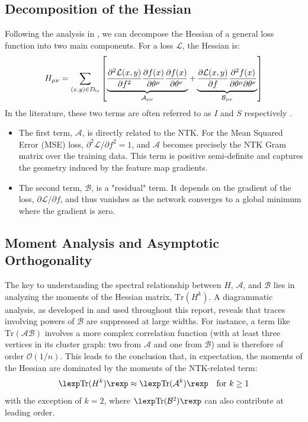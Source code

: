 \documentclass{article}
\begin{document}
\subsection{Decomposition of the Hessian}
Following the analysis in \cite{dyer2019asymptotics}, we can decompose the Hessian of a general loss function into two main components. For a loss $\mathcal{L}$, the Hessian is:
\begin{equation}
H_{\mu\nu} = \sum_{(x,y)\in D_{\rm tr}}\left[\underbrace{\frac{\partial^{2}\mathcal{L}(x,y)}{\partial f^{2}}\frac{\partial f(x)}{\partial\theta^{\mu}}\frac{\partial f(x)}{\partial\theta^{\nu}}}_{\mathcal{A}_{\mu\nu}}
+ \underbrace{\frac{\partial\mathcal{L}(x,y)}{\partial f}\frac{\partial^{2}f(x)}{\partial\theta^{\mu}\partial\theta^{\nu}}}_{\mathcal{B}_{\mu\nu}}\right]
\end{equation}
In the literature, these two terms are often referred to as $I$ and $S$ respectively \cite{jacot2020kernelhessian}.
\begin{itemize}
    \item The first term, $\mathcal{A}$, is directly related to the NTK. For the Mean Squared Error (MSE) loss, $\partial^2\mathcal{L}/\partial f^2 = 1$, and $\mathcal{A}$ becomes precisely the NTK Gram matrix over the training data. This term is positive semi-definite and captures the geometry induced by the feature map gradients.
    \item The second term, $\mathcal{B}$, is a "residual" term. It depends on the gradient of the loss, $\partial\mathcal{L}/\partial f$, and thus vanishes as the network converges to a global minimum where the gradient is zero.
\end{itemize}

\subsection{Moment Analysis and Asymptotic Orthogonality}
The key to understanding the spectral relationship between $H$, $\mathcal{A}$, and $\mathcal{B}$ lies in analyzing the moments of the Hessian matrix, $\mathrm{Tr}(H^k)$.
A diagrammatic analysis, as developed in \cite{dyer2019asymptotics} and used throughout this report, reveals that traces involving powers of $\mathcal{B}$ are suppressed at large widths. For instance, a term like $\mathrm{Tr}(\mathcal{A}\mathcal{B})$ involves a more complex correlation function (with at least three vertices in its cluster graph: two from $\mathcal{A}$ and one from $\mathcal{B}$) and is therefore of order $\mathcal{O}(1/n)$. This leads to the conclusion that, in expectation, the moments of the Hessian are dominated by the moments of the NTK-related term:
\begin{equation}
\lexp \mathrm{Tr}(H^k) \rexp \approx \lexp \mathrm{Tr}(\mathcal{A}^k) \rexp \quad \text{for } k \ge 1
\end{equation}
with the exception of $k=2$, where $\lexp \mathrm{Tr}(\mathcal{B}^2) \rexp$ can also contribute at leading order.
\end{document}

